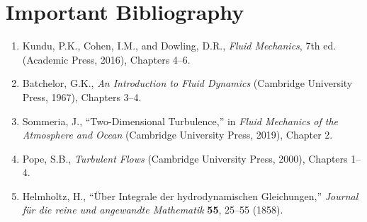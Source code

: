 \section*{Important Bibliography}

\begin{enumerate}
\item Kundu, P.K., Cohen, I.M., and Dowling, D.R., \textit{Fluid Mechanics}, 7th ed. (Academic Press, 2016), Chapters 4--6.
\item Batchelor, G.K., \textit{An Introduction to Fluid Dynamics} (Cambridge University Press, 1967), Chapters 3--4.
\item Sommeria, J., ``Two-Dimensional Turbulence,'' in \textit{Fluid Mechanics of the Atmosphere and Ocean} (Cambridge University Press, 2019), Chapter 2.
\item Pope, S.B., \textit{Turbulent Flows} (Cambridge University Press, 2000), Chapters 1--4.
\item Helmholtz, H., ``\"Uber Integrale der hydrodynamischen Gleichungen,'' \textit{Journal f\"ur die reine und angewandte Mathematik} \textbf{55}, 25--55 (1858).
\end{enumerate}


